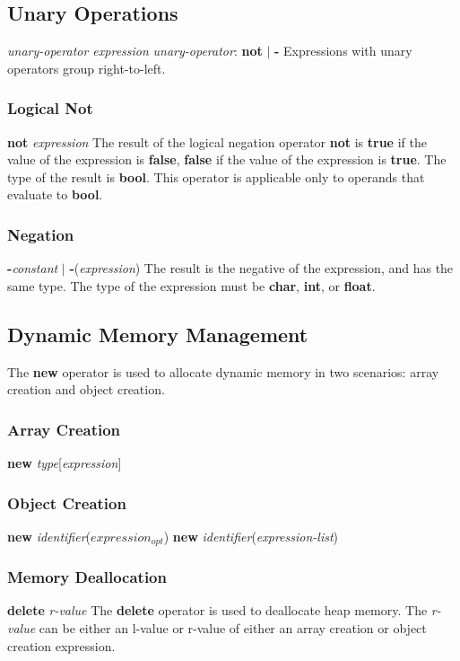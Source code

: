 \begin{homeworkProblem}
	\subsection{Unary Operations}
	\textit{unary-operator expression}
	\newline
	\textit{unary-operator}: \textbf{not} $|$ \textbf{-}
	\newline
	Expressions with unary operators group right-to-left.
	
	\subsubsection{Logical Not}
	\textbf{not} \textit{expression}
	\newline
	The result of the logical negation operator \textbf{not} is \textbf{true} if the value of the expression is \textbf{false}, \textbf{false} if the value of the expression is \textbf{true}. The type of the result is \textbf{bool}. This operator is applicable only to operands that evaluate to \textbf{bool}.
	
	\subsubsection{Negation}
	\textbf{-}\textit{constant} $|$ \textbf{-}(\textit{expression})
	\newline
	The result is the negative of the expression, and has the same type. The type of the expression must be \textbf{char}, \textbf{int}, or \textbf{float}.
	
	\subsection{Dynamic Memory Management}
	The \textbf{new} operator is used to allocate dynamic memory in two scenarios: array creation and object creation.
	\subsubsection{Array Creation}
	\textbf{new} \textit{type}[\textit{expression}]
	\subsubsection{Object Creation}
	\textbf{new} \textit{identifier}(\textit{$expression_{opt}$})
	\newline
	\textbf{new} \textit{identifier}(\textit{expression-list})
	
	\subsubsection{Memory Deallocation}
	\textbf{delete} \textit{r-value}
	\newline
	The \textbf{delete} operator is used to deallocate heap memory. The \textit{r-value} can be either an l-value or r-value of either an array creation or object creation expression.
	

\end{homeworkProblem}
